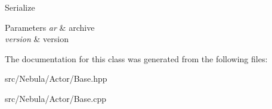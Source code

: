 \-Serialize 


\begin{DoxyParams}{\-Parameters}
{\em ar} & archive \\
\hline
{\em version} & version \\
\hline
\end{DoxyParams}


\-The documentation for this class was generated from the following files\-:\begin{DoxyCompactItemize}
\item 
src/\-Nebula/\-Actor/\-Base.\-hpp\item 
src/\-Nebula/\-Actor/\-Base.\-cpp\end{DoxyCompactItemize}
